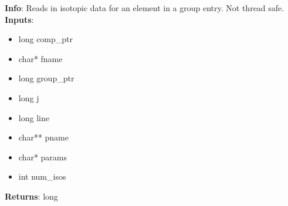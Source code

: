 \textbf{Info}: Reads in isotopic data for an element in a group entry. Not
thread safe. \\

\noindent \textbf{Inputs}:
\begin{itemize}
\item{long comp\_ptr}
\item{char* fname}
\item{long group\_ptr}
\item{long j}
\item{long line}
\item{char** pname}
\item{char* params}
\item{int num\_isos}
\end{itemize}

\noindent \textbf{Returns}: long
